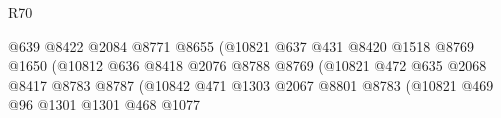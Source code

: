 \begin{lexlean}{R70}
\begin{coremodule}
                                                          @639
                                                          @8422
                                                          @2084
                                                          @8771
                                                          @8655
                                                          (@10821
                                                            @637
                                                            @431
                                                            @8420
                                                            @1518
                                                            @8769
                                                            @1650
                                                            (@10812
                                                              @636
                                                              @8418
                                                              @2076
                                                              @8788
                                                              @8769
                                                              (@10821
                                                                @472
                                                                @635
                                                                @2068
                                                                @8417
                                                                @8783
                                                                @8787
                                                                (@10842
                                                                  @471
                                                                  @1303
                                                                  @2067
                                                                  @8801
                                                                  @8783
                                                                  (@10821
                                                                    @469
                                                                    @96
                                                                    @1301
                                                                    @1301
                                                                    @468
                                                                    @1077

\end{coremodule}
\end{lexlean}
